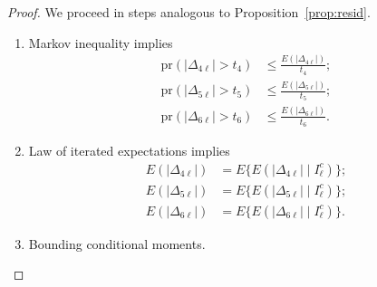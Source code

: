 \begin{proof}
We proceed in steps analogous to Proposition~\ref{prop:resid}.
\begin{enumerate}
    \item Markov inequality implies
     \begin{align*}
        \text{pr}(|\Delta_{4\ell}|>t_4)&\leq \frac{E(|\Delta_{4\ell}|)}{t_4};\\
        \text{pr}(|\Delta_{5\ell}|>t_5)&\leq \frac{E(|\Delta_{5\ell}|)}{t_5}; \\
        \text{pr}(|\Delta_{6\ell}|>t_6)&\leq \frac{E(|\Delta_{6\ell}|)}{t_6}.
    \end{align*}
    \item Law of iterated expectations implies
    \begin{align*}
        E(|\Delta_{4\ell}|)&=E\{E(|\Delta_{4\ell}|\mid I^c_{\ell})\};\\
        E(|\Delta_{5\ell}|)&=E\{E(|\Delta_{5\ell}|\mid I^c_{\ell})\}; \\
        E(|\Delta_{6\ell}|)&=E\{E(|\Delta_{6\ell}|\mid I^c_{\ell})\}.
    \end{align*}
    \item Bounding conditional moments.
    

\end{enumerate}
\end{proof}
